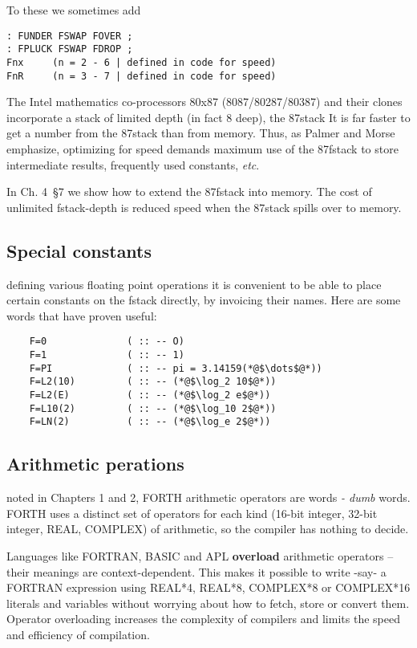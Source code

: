 To these we sometimes add

\begin{verbatim}
: FUNDER FSWAP FOVER ;
: FPLUCK FSWAP FDROP ;
Fnx     (n = 2 - 6 | defined in code for speed)
FnR     (n = 3 - 7 | defined in code for speed)
\end{verbatim}

The Intel mathematics co-processors 80x87 (8087/80287/80387)
and their clones incorporate a stack of limited depth (in fact 8
deep), the 87stack It is far faster to get a number from the 87stack
than from memory. Thus, as Palmer and Morse emphasize,
optimizing for speed demands maximum use of the 87fstack to store intermediate
results, frequently used constants, \textit{etc}.

In Ch. 4~\S7 we show how to extend the 87fstack into memory. The
cost of unlimited fstack-depth is reduced speed when the 87stack
spills over to memory.

\subsection{Special constants}
defining various floating point operations it is convenient to be
able to place certain constants on the fstack directly, by invoicing
their names. Here are some words that have proven useful:
\begin{lstlisting}
    F=0              ( :: -- O)
    F=1              ( :: -- 1)
    F=PI             ( :: -- pi = 3.14159(*@$\dots$@*))
    F=L2(10)         ( :: -- (*@$\log_2 10$@*))
    F=L2(E)          ( :: -- (*@$\log_2 e$@*))
    F=L10(2)         ( :: -- (*@$\log_10 2$@*))
    F=LN(2)          ( :: -- (*@$\log_e 2$@*))
\end{lstlisting}
 
\subsection{Arithmetic perations}
noted in Chapters 1 and 2, FORTH arithmetic operators are
words \textit{- dumb} words. FORTH uses a distinct set of operators
for each kind (16-bit integer, 32-bit integer, REAL, COMPLEX)
of arithmetic, so the compiler has nothing to decide.

Languages like FORTRAN, BASIC and APL \textbf{overload} arithmetic operators -- their
meanings are context-dependent. This
makes it possible to write -say- a FORTRAN expression using
REAL*4, REAL*8, COMPLEX*8 or COMPLEX*16 literals
and variables without worrying about how to fetch, store or
convert them. Operator overloading increases the complexity of
compilers and limits the speed and efficiency of compilation.

